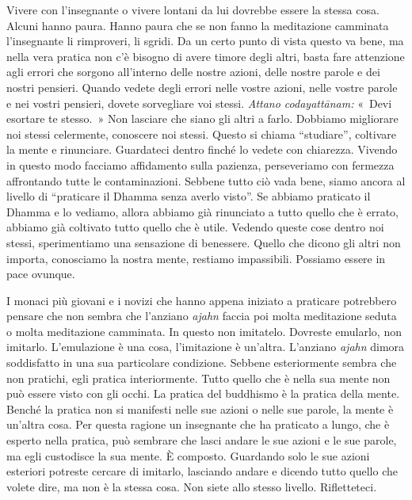 Vivere con l'insegnante o vivere lontani da lui dovrebbe essere la
stessa cosa. Alcuni hanno paura. Hanno paura che se non fanno la
meditazione camminata l'insegnante li rimproveri, li sgridi. Da un certo
punto di vista questo va bene, ma nella vera pratica non c'è bisogno di
avere timore degli altri, basta fare attenzione agli errori che sorgono
all'interno delle nostre azioni, delle nostre parole e dei nostri
pensieri. Quando vedete degli errori nelle vostre azioni, nelle vostre
parole e nei vostri pensieri, dovete sorvegliare voi stessi.
\emph{Attano codayattānam:} «~Devi esortare te stesso.~» Non lasciare
che siano gli altri a farlo. Dobbiamo migliorare noi stessi celermente,
conoscere noi stessi. Questo si chiama ``studiare'', coltivare la mente
e rinunciare. Guardateci dentro finché lo vedete con chiarezza. Vivendo
in questo modo facciamo affidamento sulla pazienza, perseveriamo con
fermezza affrontando tutte le contaminazioni. Sebbene tutto ciò vada
bene, siamo ancora al livello di ``praticare il Dhamma senza averlo
visto''. Se abbiamo praticato il Dhamma e lo vediamo, allora abbiamo già
rinunciato a tutto quello che è errato, abbiamo già coltivato tutto
quello che è utile. Vedendo queste cose dentro noi stessi, sperimentiamo
una sensazione di benessere. Quello che dicono gli altri non importa,
conosciamo la nostra mente, restiamo impassibili. Possiamo essere in
pace ovunque.

I monaci più giovani e i novizi che hanno appena iniziato a praticare
potrebbero pensare che non sembra che l'anziano \emph{ajahn} faccia poi
molta meditazione seduta o molta meditazione camminata. In questo non
imitatelo. Dovreste emularlo, non imitarlo. L'emulazione è una cosa,
l'imitazione è un'altra. L'anziano \emph{ajahn} dimora soddisfatto in
una sua particolare condizione. Sebbene esteriormente sembra che non
pratichi, egli pratica interiormente. Tutto quello che è nella sua mente
non può essere visto con gli occhi. La pratica del buddhismo è la
pratica della mente. Benché la pratica non si manifesti nelle sue azioni
o nelle sue parole, la mente è un'altra cosa. Per questa ragione un
insegnante che ha praticato a lungo, che è esperto nella pratica, può
sembrare che lasci andare le sue azioni e le sue parole, ma egli
custodisce la sua mente. È composto. Guardando solo le sue azioni
esteriori potreste cercare di imitarlo, lasciando andare e dicendo tutto
quello che volete dire, ma non è la stessa cosa. Non siete allo stesso
livello. Rifletteteci.

